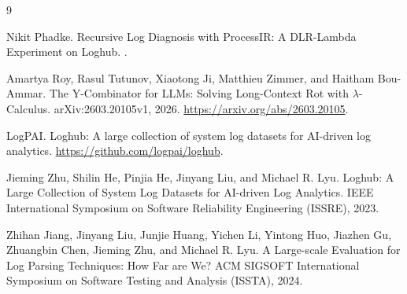\documentclass[11pt]{article}
\begin{document}
\begin{thebibliography}{9}

Nikit Phadke.
\newblock Recursive Log Diagnosis with ProcessIR: A DLR-Lambda Experiment on
Loghub.
.

Amartya Roy, Rasul Tutunov, Xiaotong Ji, Matthieu Zimmer, and Haitham
Bou-Ammar.
\newblock The Y-Combinator for LLMs: Solving Long-Context Rot with
$\lambda$-Calculus.
\newblock arXiv:2603.20105v1, 2026.
\newblock \url{https://arxiv.org/abs/2603.20105}.

LogPAI.
\newblock Loghub: A large collection of system log datasets for AI-driven log
analytics.
\newblock \url{https://github.com/logpai/loghub}.

Jieming Zhu, Shilin He, Pinjia He, Jinyang Liu, and Michael R. Lyu.
\newblock Loghub: A Large Collection of System Log Datasets for AI-driven Log
Analytics.
\newblock IEEE International Symposium on Software Reliability Engineering
(ISSRE), 2023.

Zhihan Jiang, Jinyang Liu, Junjie Huang, Yichen Li, Yintong Huo, Jiazhen Gu,
Zhuangbin Chen, Jieming Zhu, and Michael R. Lyu.
\newblock A Large-scale Evaluation for Log Parsing Techniques: How Far are We?
\newblock ACM SIGSOFT International Symposium on Software Testing and Analysis
(ISSTA), 2024.

\end{thebibliography}
\end{document}
